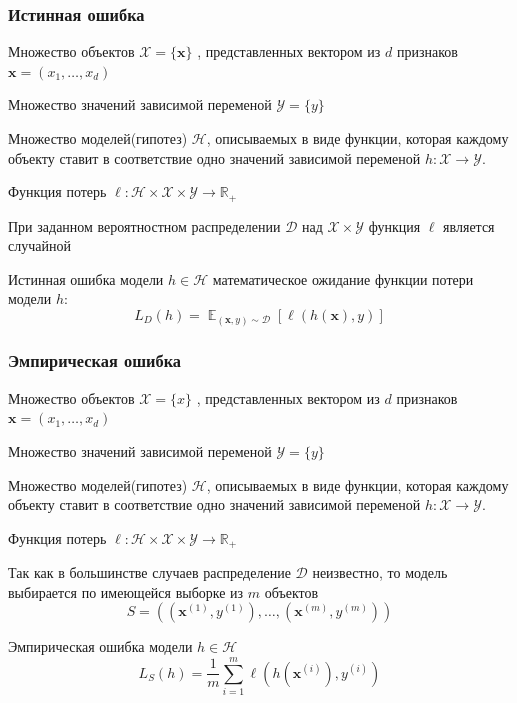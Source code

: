\documentclass[notheorems]{beamer} %
\begin{document}
\begin{frame}
	\frametitle{Истинная ошибка }
	
	
	Множество объектов  $\mathcal{X}=\{\textbf{x} \}$ , представленных вектором из  $d$ признаков $\textbf{x}=(x_1, \dots,x_d)$
	
	Множество значений зависимой переменой $\mathcal{Y}=\{y \}$  
	
	Множество моделей(гипотез) $\mathcal{H}$, описываемых в виде функции, которая каждому объекту ставит в соответствие одно  значений зависимой переменой $h: \mathcal{X} \to \mathcal{Y}$.
	
	Функция потерь $ \ell:\mathcal{H} \times \mathcal{X} \times \mathcal{Y} \to \mathbb{R_+}$
	
	При заданном \alert{вероятностном распределении $\mathcal{D}$ над $ \mathcal{X}\times\mathcal{Y} $} функция $ \ell $ является случайной
	\begin{block}{Истинная ошибка модели $ h \in \mathcal{H} $ }
		математическое ожидание функции потери  модели  $ h $:
		$$L_D(h) = \mathop{\mathbb{E}}_{(\textbf{x},y)\sim\mathcal{D}} [\ell(h(\textbf{x}),y)] $$ 
	\end{block}
	
\end{frame}

\begin{frame}
	\frametitle{Эмпирическая ошибка}
	
	
	Множество объектов  $\mathcal{X}=\{x \}$ , представленных вектором из  $d$ признаков $\mathbf{x}=(x_1, \dots,x_d)$
	
	Множество значений зависимой переменой $\mathcal{Y}=\{y \}$  
	
	Множество моделей(гипотез) $\mathcal{H}$, описываемых в виде функции, которая каждому объекту ставит в соответствие одно  значений зависимой переменой $h: \mathcal{X} \to \mathcal{Y}$.
	
	Функция потерь $ \ell:\mathcal{H} \times \mathcal{X} \times \mathcal{Y} \to \mathbb{R_+}$
	
	Так как в большинстве случаев распределение $\mathcal{D}$ неизвестно, то модель выбирается по \alert{имеющейся выборке из $m$ объектов $$ S =  ((\textbf{x}^{(1)},y^{(1)}), \dots, (\textbf{x}^{(m)}, y^{(m)}))$$ }
	
	
	\begin{block}{Эмпирическая ошибка модели $ h \in \mathcal{H} $ }
		\begin{equation}
		\label{eqn:emp_risk}
		L_S(h) = \frac{1}{m}\sum_{i=1}^{m} \ell(h(\textbf{x}^{(i)}),y^{(i)}) 
		\end{equation}
	\end{block}
	
\end{frame}
\end{document}

